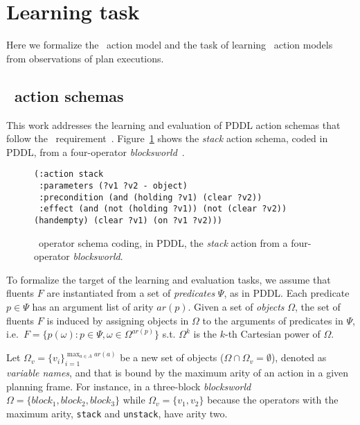 \section{Learning task}
\label{sec:learning}
Here we formalize the \strips\ action model and the task of learning \strips\ action models from observations of plan executions.


\subsection{\strips\ action schemas}
This work addresses the learning and evaluation of PDDL action schemas that follow the \strips\ requirement~\cite{mcdermott1998pddl,fox2003pddl2}. Figure~\ref{fig:stack} shows the {\em stack} action schema, coded in PDDL, from a four-operator {\em blocksworld}~\cite{slaney2001blocks}.

\begin{figure}[hbt!]
\begin{footnotesize}
\begin{verbatim}
(:action stack
 :parameters (?v1 ?v2 - object)
 :precondition (and (holding ?v1) (clear ?v2))
 :effect (and (not (holding ?v1)) (not (clear ?v2)) (handempty) (clear ?v1) (on ?v1 ?v2)))
\end{verbatim}
\end{footnotesize}
 \caption{\small \strips\ operator schema coding, in PDDL, the {\em stack} action from a four-operator {\em blocksworld}.}
\label{fig:stack}
\end{figure}

To formalize the target of the learning and evaluation tasks, we assume that fluents $F$ are instantiated from a set of {\em predicates} $\Psi$, as in PDDL. Each predicate $p\in\Psi$ has an argument list of arity $ar(p)$. Given a set of {\em objects} $\Omega$, the set of fluents $F$ is induced by assigning objects in $\Omega$ to the arguments of predicates in $\Psi$, i.e.~$F=\{p(\omega):p\in\Psi,\omega\in\Omega^{ar(p)}\}$ s.t. $\Omega^k$ is the $k$-th Cartesian power of $\Omega$.

Let $\Omega_v=\{v_i\}_{i=1}^{\operatorname*{max}_{a\in A} ar(a)}$ be a new set of objects ($\Omega\cap\Omega_v=\emptyset$), denoted as {\em variable names}, and that is bound by the maximum arity of an action in a given planning frame. For instance, in a three-block {\em blocksworld} $\Omega=\{block_1, block_2, block_3\}$ while $\Omega_v=\{v_1, v_2\}$ because the operators with the maximum arity, {\small\tt stack} and {\small\tt unstack}, have arity two.

